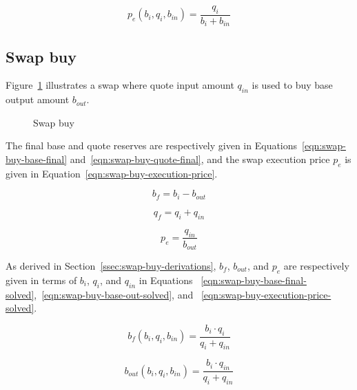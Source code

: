 \documentclass[table, twocolumn]{article}
\begin{document}
\begin{equation}\label{eqn:swap-sell-execution-price-solved}
	p_e (b_i, q_i, b_{in}) = \frac{q_i}{b_i + b_{in}}
\end{equation}

\subsection{Swap buy}\label{ssec:swap-buy}

Figure~\ref{fig:swap-buy} illustrates a swap where quote input amount $q_{in}$ is used
to buy base output amount $b_{out}$.

\begin{figure}[!htb]
	\centering
	
	\caption{Swap buy}\label{fig:swap-buy}
\end{figure}

The final base and quote reserves are respectively given in
Equations~\ref{eqn:swap-buy-base-final} and~\ref{eqn:swap-buy-quote-final}, and the
swap execution price $p_e$ is given in Equation~\ref{eqn:swap-buy-execution-price}.

\begin{equation}\label{eqn:swap-buy-base-final}
	b_f = b_i - b_{out}
\end{equation}

\begin{equation}\label{eqn:swap-buy-quote-final}
	q_f = q_i + q_{in}
\end{equation}

\begin{equation}\label{eqn:swap-buy-execution-price}
	p_e = \frac{q_{in}}{b_{out}}
\end{equation}

As derived in Section~\ref{ssec:swap-buy-derivations}, $b_f$, $b_{out}$, and $p_e$ are
respectively given in terms of $b_i$, $q_i$, and $q_{in}$ in Equations%
~\ref{eqn:swap-buy-base-final-solved},~\ref{eqn:swap-buy-base-out-solved}, and%
~\ref{eqn:swap-buy-execution-price-solved}.

\begin{equation}\label{eqn:swap-buy-base-final-solved}
	b_f(b_i, q_i, b_{in}) = \frac{b_i \cdot q_i}{q_i + q_{in}}
\end{equation}

\begin{equation}\label{eqn:swap-buy-base-out-solved}
	b_{out} (b_i, q_i, b_{in}) = \frac{b_i \cdot q_{in}}{q_i + q_{in}}
\end{equation}
\end{document}

